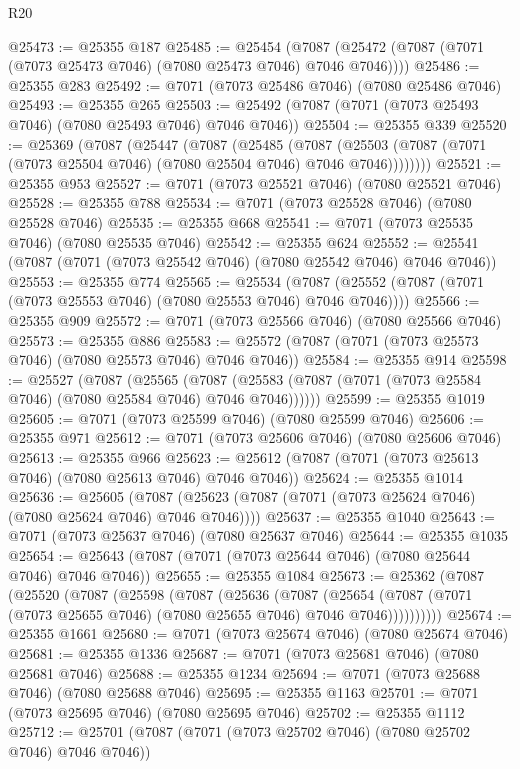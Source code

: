 \begin{lexlean}{R20}
\begin{coremodule}
{@25473 := @25355 @187
@25485 := @25454
    (@7087 (@25472 (@7087 (@7071 (@7073 @25473 @7046) (@7080 @25473 @7046) @7046 @7046))))
@25486 := @25355 @283
@25492 := @7071 (@7073 @25486 @7046) (@7080 @25486 @7046)
@25493 := @25355 @265
@25503 := @25492 (@7087 (@7071 (@7073 @25493 @7046) (@7080 @25493 @7046) @7046 @7046))
@25504 := @25355 @339
@25520 := @25369
    (@7087
      (@25447
        (@7087
          (@25485
            (@7087
              (@25503 (@7087 (@7071 (@7073 @25504 @7046) (@7080 @25504 @7046) @7046 @7046))))))))
@25521 := @25355 @953
@25527 := @7071 (@7073 @25521 @7046) (@7080 @25521 @7046)
@25528 := @25355 @788
@25534 := @7071 (@7073 @25528 @7046) (@7080 @25528 @7046)
@25535 := @25355 @668
@25541 := @7071 (@7073 @25535 @7046) (@7080 @25535 @7046)
@25542 := @25355 @624
@25552 := @25541 (@7087 (@7071 (@7073 @25542 @7046) (@7080 @25542 @7046) @7046 @7046))
@25553 := @25355 @774
@25565 := @25534
    (@7087 (@25552 (@7087 (@7071 (@7073 @25553 @7046) (@7080 @25553 @7046) @7046 @7046))))
@25566 := @25355 @909
@25572 := @7071 (@7073 @25566 @7046) (@7080 @25566 @7046)
@25573 := @25355 @886
@25583 := @25572 (@7087 (@7071 (@7073 @25573 @7046) (@7080 @25573 @7046) @7046 @7046))
@25584 := @25355 @914
@25598 := @25527
    (@7087
      (@25565
        (@7087 (@25583 (@7087 (@7071 (@7073 @25584 @7046) (@7080 @25584 @7046) @7046 @7046))))))
@25599 := @25355 @1019
@25605 := @7071 (@7073 @25599 @7046) (@7080 @25599 @7046)
@25606 := @25355 @971
@25612 := @7071 (@7073 @25606 @7046) (@7080 @25606 @7046)
@25613 := @25355 @966
@25623 := @25612 (@7087 (@7071 (@7073 @25613 @7046) (@7080 @25613 @7046) @7046 @7046))
@25624 := @25355 @1014
@25636 := @25605
    (@7087 (@25623 (@7087 (@7071 (@7073 @25624 @7046) (@7080 @25624 @7046) @7046 @7046))))
@25637 := @25355 @1040
@25643 := @7071 (@7073 @25637 @7046) (@7080 @25637 @7046)
@25644 := @25355 @1035
@25654 := @25643 (@7087 (@7071 (@7073 @25644 @7046) (@7080 @25644 @7046) @7046 @7046))
@25655 := @25355 @1084
@25673 := @25362
    (@7087
      (@25520
        (@7087
          (@25598
            (@7087
              (@25636
                (@7087
                  (@25654
                    (@7087 (@7071 (@7073 @25655 @7046) (@7080 @25655 @7046) @7046 @7046))))))))))
@25674 := @25355 @1661
@25680 := @7071 (@7073 @25674 @7046) (@7080 @25674 @7046)
@25681 := @25355 @1336
@25687 := @7071 (@7073 @25681 @7046) (@7080 @25681 @7046)
@25688 := @25355 @1234
@25694 := @7071 (@7073 @25688 @7046) (@7080 @25688 @7046)
@25695 := @25355 @1163
@25701 := @7071 (@7073 @25695 @7046) (@7080 @25695 @7046)
@25702 := @25355 @1112
@25712 := @25701 (@7087 (@7071 (@7073 @25702 @7046) (@7080 @25702 @7046) @7046 @7046))
}
\end{coremodule}
\end{lexlean}
